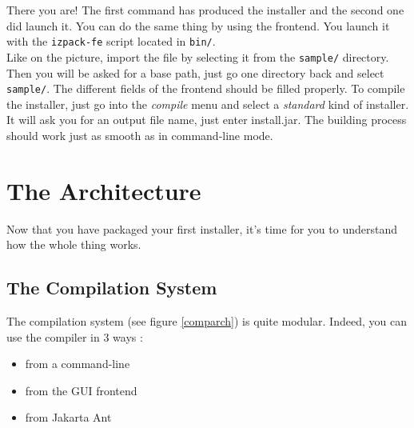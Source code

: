 There you are! The first command has produced the installer and the
second one did launch it. You can do the same thing by using the
frontend. You launch it with the \texttt{izpack-fe} script located in
\texttt{bin/}.\\

 Like on
the picture, import the file by selecting it from the \texttt{sample/}
directory. Then you will be asked for a base path, just go one directory
back and select \texttt{sample/}. The different fields of the frontend
should be filled properly. To compile the installer, just go into the
\textit{compile} menu and select a \textit{standard} kind of installer.
It will ask you for an output file name, just enter install.jar. The
building process should work just as smooth as in command-line mode.\\

\section{The \IzPack Architecture}

Now that you have packaged your first installer, it's time for you to understand
how the whole thing works.\\

\subsection{The Compilation System}

The compilation system (see figure \ref{comparch}) is quite modular. 
Indeed, you can use the compiler in 3 ways :
\begin{itemize}
	\item from a command-line
	\item from the GUI frontend
	\item from Jakarta Ant
\end{itemize}\


